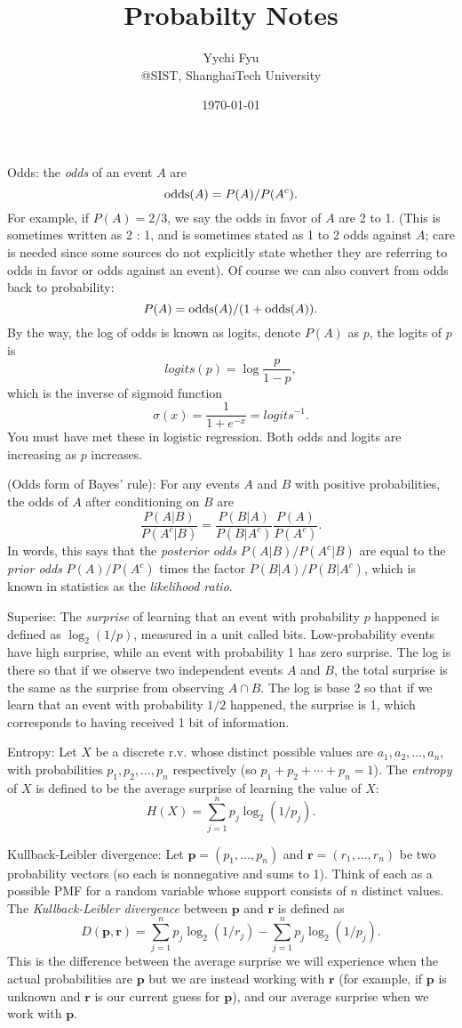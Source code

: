 \documentclass{./utils/mydoc}
\title{\bfseries \sffamily Probabilty Notes}
\author{Yychi Fyu \\ @SIST, ShanghaiTech University}
\date{\today}
\begin{document}
\maketitle

Odds: the \emph{odds} of an event $A$ are
\[
  \mathop{\rm odds}(A) = P(A)/P(A^c).
\]
For example, if $P(A) = 2/3$, we say the odds in favor of $A$ are 2 to 1. 
(This is sometimes written as 2 : 1, and is sometimes stated as 1 to 2 odds
against $A$; care is needed since some sources do not explicitly state whether
they are referring to odds in favor or odds against an event). Of course we 
can also convert from odds back to probability:
\[
  P(A) = \mathop{\rm odds}(A)/(1 + \mathop{\rm odds}(A)).
\]
By the way, the log of odds is known as logits, denote $P(A)$ as $p$, the
logits of $p$ is
\[
  logits(p) = \log \frac{p}{1-p},
\]
which is the inverse of sigmoid function
\[
  \sigma(x) = \frac{1}{1 + e^{-x}} = logits^{-1}.
\]
You must have met these in logistic regression. Both odds and logits are
increasing as $p$ increases.

(Odds form of Bayes’ rule): For any events $A$ and $B$ with positive
probabilities, the odds of $A$ after conditioning on $B$ are
\[
  \frac{P(A|B)}{P(A^c|B)} = \frac{P(B|A)}{P(B|A^c)}\frac{P(A)}{P(A^c)}.
\]
In words, this says that the \emph{posterior odds} $P(A|B)/P(A^c|B)$ are equal
to the \emph{prior odds} $P(A)/P(A^c)$ times the factor $P(B|A)/P(B|A^c)$, 
which is known in statistics as the \emph{likelihood ratio}.

Superise: 
The \emph{surprise} of learning that an event with probability $p$ happened is 
defined as $\log_2 (1/p)$, measured in a unit called bits. Low-probability 
events have high surprise, while an event with probability 1 has zero surprise. 
The log is there so that if we observe two independent events $A$ and $B$, the 
total surprise is the same as the surprise from observing $A \cap B$. The log 
is base 2 so that if we learn that an event with probability $1/2$ happened, 
the surprise is 1, which corresponds to having received 1 bit of information.

Entropy:
Let $X$ be a discrete r.v. whose distinct possible values are 
$a_1, a_2, \dots,  a_n$, with probabilities $p_1, p_2,\dots, p_n$ respectively 
(so $p_1 + p_2 + \cdots + p_n = 1$). The \emph{entropy} of $X$ is defined to 
be the average surprise of learning the value of $X$:
\[
  H(X) = \sum_{j=1}^n p_j \log_2(1/p_j).
\]

Kullback-Leibler divergence: Let $\mathbf{p} = (p_1, \dots, p_n)$ and 
$\mathbf{r} = (r_1, \dots, r_n)$ be two probability vectors (so each is 
nonnegative and sums to 1). Think of each as a possible PMF for a random 
variable whose support consists of $n$ distinct values. The 
\emph{Kullback-Leibler divergence} between $\mathbf{p}$ and $\mathbf{r}$ is 
defined as
\[
  D(\mathbf{p}, \mathbf{r}) = \sum_{j=1}^n p_j \log_2 (1 / r_j) -
    \sum_{j=1}^n p_j \log_2 (1 / p_j).
\]
This is the difference between the average surprise we will experience when the
actual probabilities are $\mathbf{p}$ but we are instead working with 
$\mathbf{r}$ (for example, if $\mathbf{p}$ is unknown and $\mathbf{r}$ is our 
current guess for $\mathbf{p}$), and our average surprise when we work with 
$\mathbf{p}$.
\end{document}
